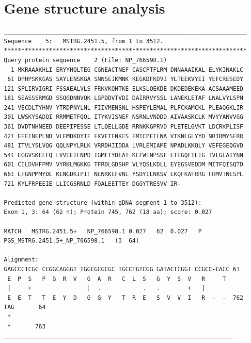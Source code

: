 \pagebreak
\section{Gene structure analysis}
\begingroup\small\begin{verbatim}
______________________________________________________________________
Sequence    5:   MSTRG.2451.5, from 1 to 3512.
**********************************************************************
Query protein sequence    2 (File: NP_766598.1)
  1 MKRAAAKHLI ERYYHQLTEG CGNEACTNEF CASCPTFLRM DNNAAAIKAL ELYKINAKLC
 61 DPHPSKKGAS SAYLENSKGA SNNSEIKMNK KEGKDFKDVI YLTEEKVYEI YEFCRESEDY
121 SPLIRVIGRI FSSAEALVLS FRKVKQHTKE ELKSLQEKDE DKDEDEKEKA ACSAAAMEED
181 SEASSSRMGD SSQGDNNVQK LGPDDVTVDI DAIRRVYSSL LANEKLETAF LNALVYLSPN
241 VECDLTYHNV YTRDPNYLNL FIIVMENSNL HSPEYLEMAL PLFCKAMCKL PLEAQGKLIR
301 LWSKYSADQI RRMMETFQQL ITYKVISNEF NSRNLVNDDD AIVAASKCLK MVYYANVVGG
361 DVDTNHNEED DEEPIPESSE LTLQELLGDE RRNKKGPRVD PLETELGVKT LDCRKPLISF
421 EEFINEPLND VLEMDKDYTF FKVETENKFS FMTCPFILNA VTKNLGLYYD NRIRMYSERR
481 ITVLYSLVQG QQLNPYLRLK VRRDHIIDDA LVRLEMIAME NPADLKKQLY VEFEGEQGVD
541 EGGVSKEFFQ LVVEEIFNPD IGMFTYDEAT KLFWFNPSSF ETEGQFTLIG IVLGLAIYNN
601 CILDVHFPMV VYRKLMGKKG TFRDLGDSHP VLYQSLKDLL EYEGSVEDDM MITFQISQTD
661 LFGNPMMYDL KENGDKIPIT NENRKEFVNL YSDYILNKSV EKQFKAFRRG FHMVTNESPL
721 KYLFRPEEIE LLICGSRNLD FQALEETTEY DGGYTRESVV IR-

Predicted gene structure (within gDNA segment 1 to 3512):
Exon 1, 3: 64 (62 n); Protein 745, 762 (18 aa); score: 0.027

MATCH	MSTRG.2451.5+	NP_766598.1	0.027	62	0.027	P
PGS_MSTRG.2451.5+_NP_766598.1	(3  64)

Alignment:
GAGCCCTCGC CCGGCAGGGT TGGCGCGCGC TGCCTGTCGG GATACTCGGT CCGCC-CACC 61
 E  P  S   P  G  R  V   G  A  R   C  L  S   G  Y  S  V   R     T  
 |     +                |  .            .   .        +   |        
 E  E  T   T  E  Y  D   G  G  Y   T  R  E   S  V  V  I   R  -  -  762
TAG       64
 * 
 *       763
__________________________________________________________________
\end{verbatim}
\endgroup

